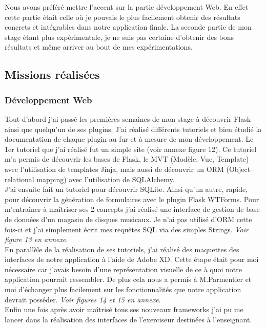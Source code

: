 \documentclass[12pt]{article}
\begin{document}
Nous avons préféré mettre l'accent sur la partie développement Web. En effet cette partie était celle où je pouvais le plus facilement obtenir des résultats concrets et intégrables dans notre application finale. La seconde partie de mon stage étant plus expérimentale, je ne suis pas certaine d'obtenir des bons résultats et même arriver au bout de mes expérimentations.  

\subsection{Missions réalisées}

\subsubsection{Développement Web}

Tout d’abord j’ai passé les premières semaines de mon stage à découvrir Flask ainsi que quelqu’un de ses plugins. J’ai réalisé différents tutoriels et bien étudié la documentation de chaque plugin au fur et à mesure de mon développement. Le 1er tutoriel que j’ai réalisé fut un simple site (voir annexe figure 12). Ce tutoriel m’a permis de découvrir les bases de Flask, le MVT (Modèle, Vue, Template) avec l’utilisation de templates Jinja, mais aussi de découvrir un ORM (Object–relational mapping) avec l’utilisation de SQLAlchemy. \\

J’ai ensuite fait un tutoriel pour découvrir SQLite. Ainsi qu’un autre, rapide, pour découvrir la génération de formulaires avec le plugin Flask WTForms. Pour m’entraîner à maîtriser ses 2 concepts j’ai réalisé une interface de gestion de base de données d’un magasin de disques musicaux. Je n’ai pas utilisé d’ORM cette fois-ci et j’ai simplement écrit mes requêtes SQL via des simples Strings. \textit{Voir figure 13 en annexe}. \\

En parallèle de la réalisation de ses tutoriels, j’ai réalisé des maquettes des interfaces de notre application à l’aide de Adobe XD. Cette étape était pour moi nécessaire car j’avais besoin d’une représentation visuelle de ce à quoi notre application pourrait ressembler. De plus cela nous a permis à M.Parmentier et moi d’échanger plus facilement sur les fonctionnalités que notre application devrait posséder.   \textit{Voir figures 14 et 15 en annexe}. \\
 
Enfin une fois après avoir maîtrisé tous ses nouveaux frameworks j’ai pu me lancer dans la réalisation des interfaces de l’exerciseur destinées à l’enseignant. \\
\end{document}
